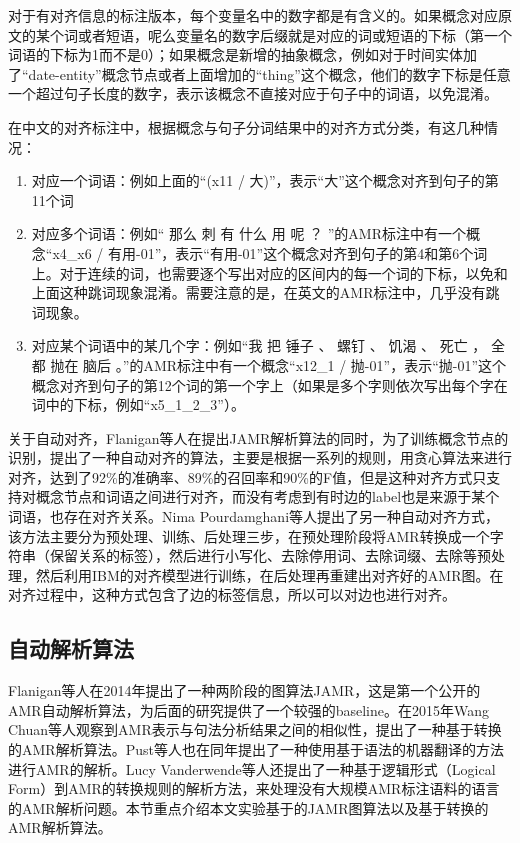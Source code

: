 \documentclass[master, winfont]{njuthesis}
\begin{document}
对于有对齐信息的标注版本，每个变量名中的数字都是有含义的。如果概念对应原文的某个词或者短语，呢么变量名的数字后缀就是对应的词或短语的下标（第一个词语的下标为1而不是0）；如果概念是新增的抽象概念，例如对于时间实体加了“date-entity”概念节点或者上面增加的“thing”这个概念，他们的数字下标是任意一个超过句子长度的数字，表示该概念不直接对应于句子中的词语，以免混淆。

在中文的对齐标注中，根据概念与句子分词结果中的对齐方式分类，有这几种情况：
\begin{enumerate}
	\item 对应一个词语：例如上面的“(x11 / 大)”，表示“大”这个概念对齐到句子的第11个词
	\item 对应多个词语：例如“ 那么 刺 有 什么 用 呢 ？ ”的AMR标注中有一个概念“x4\_x6 / 有用-01”，表示“有用-01”这个概念对齐到句子的第4和第6个词上。对于连续的词，也需要逐个写出对应的区间内的每一个词的下标，以免和上面这种跳词现象混淆。需要注意的是，在英文的AMR标注中，几乎没有跳词现象。
	\item 对应某个词语中的某几个字：例如“我 把 锤子 、 螺钉 、 饥渴 、 死亡 ， 全都 抛在 脑后 。”的AMR标注中有一个概念“x12\_1 / 抛-01”，表示“抛-01”这个概念对齐到句子的第12个词的第一个字上（如果是多个字则依次写出每个字在词中的下标，例如“x5\_1\_2\_3”）。
\end{enumerate}

关于自动对齐，Flanigan等人\cite{Flanigan2014}在提出JAMR解析算法的同时，为了训练概念节点的识别，提出了一种自动对齐的算法，主要是根据一系列的规则，用贪心算法来进行对齐，达到了92\%的准确率、89\%的召回率和90\%的F值，但是这种对齐方式只支持对概念节点和词语之间进行对齐，而没有考虑到有时边的label也是来源于某个词语，也存在对齐关系。Nima Pourdamghani等人\cite{Pourdamghani2014}提出了另一种自动对齐方式，该方法主要分为预处理、训练、后处理三步，在预处理阶段将AMR转换成一个字符串（保留关系的标签），然后进行小写化、去除停用词、去除词缀、去除等预处理，然后利用IBM的对齐模型进行训练，在后处理再重建出对齐好的AMR图。在对齐过程中，这种方式包含了边的标签信息，所以可以对边也进行对齐。


\subsection{自动解析算法}
Flanigan等人\cite{Flanigan2014}在2014年提出了一种两阶段的图算法JAMR，这是第一个公开的AMR自动解析算法，为后面的研究提供了一个较强的baseline。在2015年Wang Chuan\cite{Wang2015}等人观察到AMR表示与句法分析结果之间的相似性，提出了一种基于转换的AMR解析算法。Pust等人\cite{Pust2015}也在同年提出了一种使用基于语法的机器翻译的方法进行AMR的解析。Lucy Vanderwende等人\cite{Vanderwende2015}还提出了一种基于逻辑形式（Logical Form）到AMR的转换规则的解析方法，来处理没有大规模AMR标注语料的语言的AMR解析问题。本节重点介绍本文实验基于的JAMR图算法以及基于转换的AMR解析算法。
\end{document}
